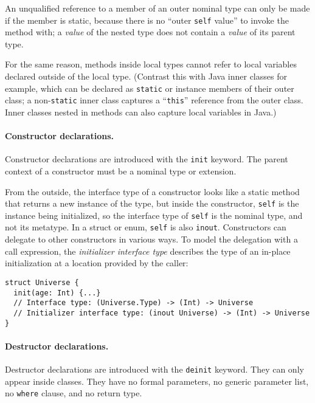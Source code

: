 \documentclass[../generics]{subfiles}
\begin{document}
An unqualified reference to a member of an outer nominal type can only be made if the member is static, because there is no ``outer \texttt{self} value'' to invoke the method with; a \emph{value} of the nested type does not contain a \emph{value} of its parent type.

For the same reason, methods inside local types cannot refer to local variables declared outside of the local type. (Contrast this with Java inner classes for example, which can be declared as \texttt{static} or instance members of their outer class; a non-\texttt{static} inner class captures a ``\texttt{this}'' reference from the outer class. Inner classes nested in methods can also capture local variables in Java.)

\paragraph{Constructor declarations.}
Constructor declarations are introduced with the \texttt{init} keyword. The parent context of a constructor must be a nominal type or extension.

From the outside, the interface type of a constructor looks like a static method that returns a new instance of the type, but inside the constructor, \texttt{self} is the instance being initialized, so the interface type of \texttt{self} is the nominal type, and not its metatype. In a struct or enum, \texttt{self} is also \texttt{inout}. Constructors can delegate to other constructors in various ways. To model the delegation with a call expression, the \emph{initializer interface type} describes the type of an in-place initialization at a location provided by the caller:
\begin{Verbatim}
struct Universe {
  init(age: Int) {...}
  // Interface type: (Universe.Type) -> (Int) -> Universe
  // Initializer interface type: (inout Universe) -> (Int) -> Universe
}
\end{Verbatim}

\paragraph{Destructor declarations.}
Destructor declarations are introduced with the \texttt{deinit} keyword. They can only appear inside classes. They have no formal parameters, no generic parameter list, no \texttt{where} clause, and no return type.
\end{document}
